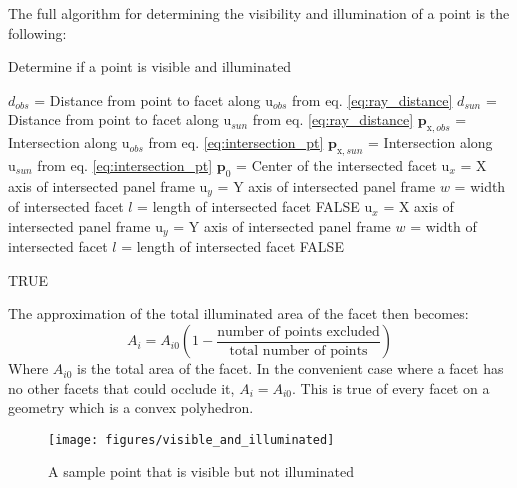 The full algorithm for determining the visibility and illumination of a point is the following:
\begin{algorithm}
	\caption{Determine if a point is visible and illuminated}
	\begin{algorithmic}
		
			\STATE $d_{obs}$ = Distance from point to facet along $\bm{\mathrm{u}}_{obs}$ from eq. \ref{eq:ray_distance}
			\STATE $d_{sun}$ = Distance from point to facet along $\bm{\mathrm{u}}_{sun}$ from eq. \ref{eq:ray_distance}
			\STATE $\bm{p}_{\mathrm{x}, obs}$ = Intersection along $\bm{\mathrm{u}}_{obs}$ from eq. \ref{eq:intersection_pt} 
			\STATE $\bm{p}_{\mathrm{x}, sun}$ = Intersection along $\bm{\mathrm{u}}_{sun}$ from eq. \ref{eq:intersection_pt}
			\STATE $\bm{p}_0$ = Center of the intersected facet
			\STATE $\bm{\mathrm{u}}_{x}$ = X axis of intersected panel frame
			\STATE $\bm{\mathrm{u}}_{y}$ = Y axis of intersected panel frame
			\STATE $w$ = width of intersected facet
			\STATE $l$ = length of intersected facet
				\RETURN FALSE 
			\ENDIF
			\ENDIF
			\STATE $\bm{\mathrm{u}}_{x}$ = X axis of intersected panel frame
			\STATE $\bm{\mathrm{u}}_{y}$ = Y axis of intersected panel frame
			\STATE $w$ = width of intersected facet
			\STATE $l$ = length of intersected facet
				\RETURN FALSE 
			\ENDIF
			\ENDIF
			
		\ENDFOR
		\RETURN TRUE 

	\end{algorithmic}
\end{algorithm}

The approximation of the total illuminated area of the facet then becomes:
\begin{equation}
A_i = A_{i0} \left( 1 - \frac{\text{number of points excluded}}{\text{total number of points}} \right)
\end{equation}
Where $A_{i0}$ is the total area of the facet. In the convenient case where a facet has no other facets that could occlude it, $A_i = A_{i0}$. This is true of every facet on a geometry which is a convex polyhedron.
\begin{figure}[h!]
	\centering
	\texttt{[image: figures/visible\_and\_illuminated]}
	\caption{A sample point that is visible but not illuminated}
	\label{sample_pts}
\end{figure}